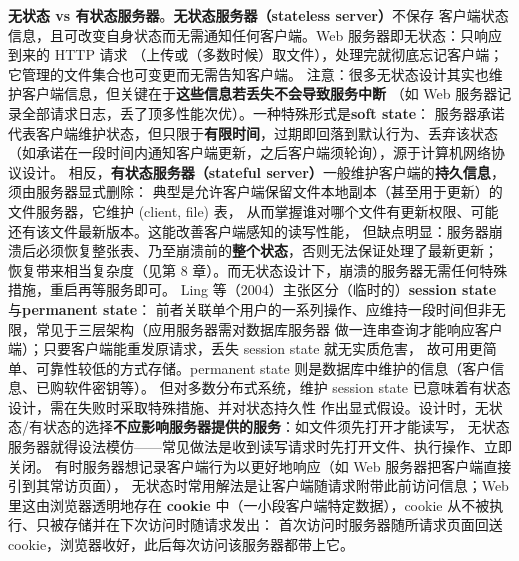 \medskip\noindent\textbf{无状态 vs 有状态服务器}。\textbf{无状态服务器（stateless server）}不保存
客户端状态信息，且可改变自身状态而无需通知任何客户端。Web 服务器即无状态：只响应到来的 HTTP 请求
（上传或（多数时候）取文件），处理完就彻底忘记客户端；它管理的文件集合也可变更而无需告知客户端。
注意：很多无状态设计其实也维护客户端信息，但关键在于\textbf{这些信息若丢失不会导致服务中断}
（如 Web 服务器记录全部请求日志，丢了顶多性能次优）。一种特殊形式是\textbf{soft state}：
服务器承诺代表客户端维护状态，但只限于\textbf{有限时间}，过期即回落到默认行为、丢弃该状态
（如承诺在一段时间内通知客户端更新，之后客户端须轮询），源于计算机网络协议设计。
相反，\textbf{有状态服务器（stateful server）}一般维护客户端的\textbf{持久信息}，须由服务器显式删除：
典型是允许客户端保留文件本地副本（甚至用于更新）的文件服务器，它维护 (client, file) 表，
从而掌握谁对哪个文件有更新权限、可能还有该文件最新版本。这能改善客户端感知的读写性能，
但缺点明显：服务器崩溃后必须恢复整张表、乃至崩溃前的\textbf{整个状态}，否则无法保证处理了最新更新；
恢复带来相当复杂度（见第 8 章）。而无状态设计下，崩溃的服务器无需任何特殊措施，重启再等服务即可。
Ling 等（2004）主张区分（临时的）\textbf{session state} 与\textbf{permanent state}：
前者关联单个用户的一系列操作、应维持一段时间但非无限，常见于三层架构（应用服务器需对数据库服务器
做一连串查询才能响应客户端）；只要客户端能重发原请求，丢失 session state 就无实质危害，
故可用更简单、可靠性较低的方式存储。permanent state 则是数据库中维护的信息（客户信息、已购软件密钥等）。
但对多数分布式系统，维护 session state 已意味着有状态设计，需在失败时采取特殊措施、并对状态持久性
作出显式假设。设计时，无状态/有状态的选择\textbf{不应影响服务器提供的服务}：如文件须先打开才能读写，
无状态服务器就得设法模仿——常见做法是收到读写请求时先打开文件、执行操作、立即关闭。
有时服务器想记录客户端行为以更好地响应（如 Web 服务器把客户端直接引到其常访页面），
无状态时常用解法是让客户端随请求附带此前访问信息；Web 里这由浏览器透明地存在
\textbf{cookie} 中（一小段客户端特定数据），cookie 从不被执行、只被存储并在下次访问时随请求发出：
首次访问时服务器随所请求页面回送 cookie，浏览器收好，此后每次访问该服务器都带上它。

\begin{closeread}
\end{closeread}

